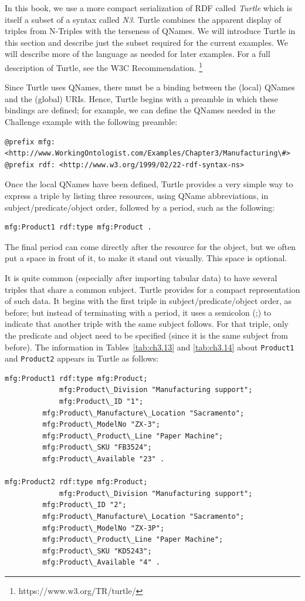 In this book, we use a more compact serialization of RDF called
\emph{Turtle} which is itself a subset of a syntax called \emph{N3}. Turtle
combines the apparent display of triples from N-Triples with the
terseness of QNames. We will introduce Turtle in this section and
describe just the subset required for the current examples. We will
describe more of the language as needed for later examples. For a full
description of Turtle, see the W3C Recommendation. \footnote{https://www.w3.org/TR/turtle/}

Since Turtle uses QNames, there must be a binding between the (local)
QNames and the (global) URIs. Hence, Turtle begins with a preamble in
which these bindings are defined; for example, we can define the QNames
needed in the Challenge example with the following preamble:

\begin{lstlisting}
@prefix mfg: <http://www.WorkingOntologist.com/Examples/Chapter3/Manufacturing\#>
@prefix rdf: <http://www.w3.org/1999/02/22-rdf-syntax-ns> 
\end{lstlisting}

Once the local QNames have been defined, Turtle provides a very simple
way to express a triple by listing three resources, using QName
abbreviations, in subject/predicate/object order, followed by a period,
such as the following:

\begin{lstlisting}
mfg:Product1 rdf:type mfg:Product .
\end{lstlisting}

The final period can come directly after the resource for the object,
but we often put a space in front of it, to make it stand out visually.
This space is optional.

It is quite common (especially after importing tabular data) to have
several triples that share a common subject. Turtle provides for a
compact representation of such data. It begins with the first triple in
subject/predicate/object order, as before; but instead of terminating
with a period, it uses a semicolon (;) to indicate that another triple
with the same subject follows. For that triple, only the predicate and
object need to be specified (since it is the same subject from before).
The information in Tables~\ref{tab:ch3.13} and \ref{tab:ch3.14} about \texttt{Product1} and \texttt{Product2}
appears in Turtle as follows:

\begin{lstlisting}
mfg:Product1 rdf:type mfg:Product;
             mfg:Product\_Division "Manufacturing support"; 
             mfg:Product\_ID "1";
	     mfg:Product\_Manufacture\_Location "Sacramento";
	     mfg:Product\_ModelNo "ZX-3"; 
	     mfg:Product\_Product\_Line "Paper Machine"; 
	     mfg:Product\_SKU "FB3524";
	     mfg:Product\_Available "23" .

mfg:Product2 rdf:type mfg:Product; 
             mfg:Product\_Division "Manufacturing support"; 
	     mfg:Product\_ID "2"; 
	     mfg:Product\_Manufacture\_Location "Sacramento"; 
	     mfg:Product\_ModelNo "ZX-3P"; 
 	     mfg:Product\_Product\_Line "Paper Machine"; 
	     mfg:Product\_SKU "KD5243";
	     mfg:Product\_Available "4" .
\end{lstlisting}

